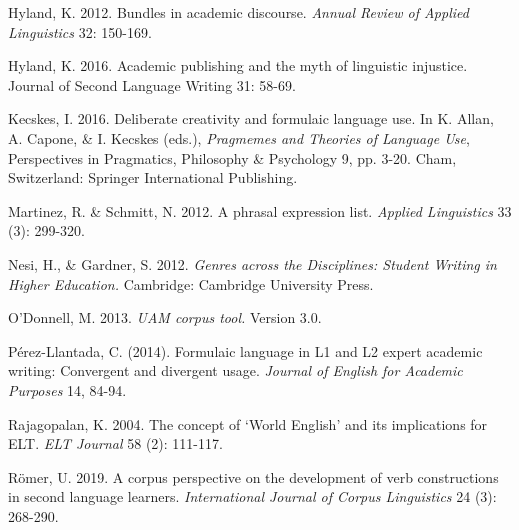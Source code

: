 \begin{styleStandard}
Hyland, K. 2012. Bundles in academic discourse. \textit{Annual Review of Applied Linguistics }32: 150-169.
\end{styleStandard}

\begin{styleStandard}
Hyland, K. 2016. Academic publishing and the myth of linguistic injustice. Journal of Second Language Writing 31: 58-69.
\end{styleStandard}

\begin{styleStandard}
Kecskes, I. 2016. Deliberate creativity and formulaic language use. In K. Allan, A. Capone, \& I. Kecskes (eds.), \textit{Pragmemes and Theories of Language Use}, Perspectives in Pragmatics, Philosophy \& Psychology 9, pp. 3-20.\textit{ }Cham, Switzerland: Springer International Publishing.
\end{styleStandard}

\begin{styleStandard}
Martinez, R. \& Schmitt, N. 2012. A phrasal expression list. \textit{Applied Linguistics }33 (3): 299-320.
\end{styleStandard}

\begin{styleStandard}
Nesi, H., \& Gardner, S. 2012. \textit{Genres across the Disciplines: Student Writing in Higher Education. }Cambridge: Cambridge University Press.
\end{styleStandard}

\begin{styleStandard}
O’Donnell, M. 2013. \textit{UAM corpus tool. }Version 3.0.
\end{styleStandard}

\begin{styleStandard}
Pérez-Llantada, C. (2014). Formulaic language in L1 and L2 expert academic writing: Convergent and divergent usage. \textit{Journal of English for Academic Purposes} 14, 84-94.
\end{styleStandard}

\begin{styleStandard}
Rajagopalan, K. 2004. The concept of ‘World English’ and its implications for ELT. \textit{ELT Journal} 58 (2): 111-117.
\end{styleStandard}

\begin{styleStandard}
Römer, U. 2019. A corpus perspective on the development of verb constructions in second language learners. \textit{International Journal of Corpus Linguistics }24 (3): 268-290.
\end{styleStandard}


